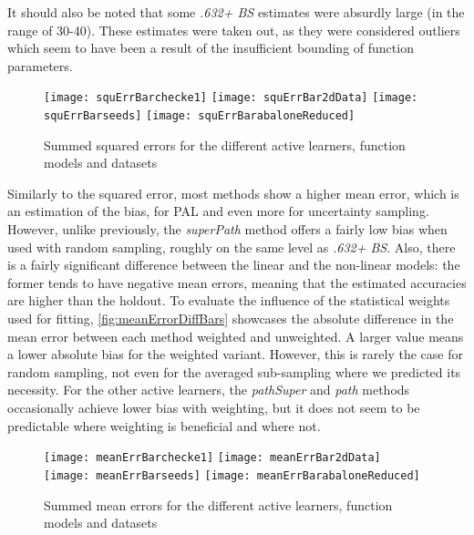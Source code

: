 It should also be noted that some \textit{.632+ BS} estimates were absurdly large (in the range of 30-40). These estimates were taken out, as they were considered outliers which seem to have been a result of the insufficient bounding of function parameters.

\begin{figure}[h]
	\centering
	\texttt{[image: squErrBarchecke1]}
	\texttt{[image: squErrBar2dData]}
	\texttt{[image: squErrBarseeds]}
	\texttt{[image: squErrBarabaloneReduced]}
	\caption{Summed squared errors for the different active learners, function models and datasets}
	\label{fig:squaredErrorBars}
\end{figure}

Similarly to the squared error, most methods show a higher mean error, which is an estimation of the bias, for PAL and even more for uncertainty sampling. However, unlike previously, the \textit{superPath} method offers a fairly low bias when used with random sampling, roughly on the same level as \textit{.632+ BS}. Also, there is a fairly significant difference between the linear and the non-linear models: the former tends to have negative mean errors, meaning that the estimated accuracies are higher than the holdout. To evaluate the influence of the statistical weights used for fitting, \ref{fig:meanErrorDiffBars} showcases the absolute difference in the mean error between each method weighted and unweighted. A larger value means a lower absolute bias for the weighted variant. However, this is rarely the case for random sampling, not even for the averaged sub-sampling where we predicted its necessity. For the other active learners, the \textit{pathSuper} and \textit{path} methods occasionally achieve lower bias with weighting, but it does not seem to be predictable where weighting is beneficial and where not.

\begin{figure}[h]
	\centering
	\texttt{[image: meanErrBarchecke1]}
	\texttt{[image: meanErrBar2dData]}
	\texttt{[image: meanErrBarseeds]}
	\texttt{[image: meanErrBarabaloneReduced]}
	\caption{Summed mean errors for the different active learners, function models and datasets}
	\label{fig:meanErrorBars}
\end{figure}

